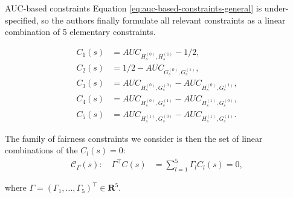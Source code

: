 \begin{frame}{AUC-based constraints}
    Equation \ref{eq:auc-based-constraints-general} is under-specified, so the authors finally formulate all relevant constraints as a linear combination of 5 elementary constraints.

    \vspace{-0.85cm} 
    \begin{align*}
        C_1(s) &= AUC_{H^{(0)}_s, H^{(1)}_s} - 1/2,\\
        C_2(s) &=   1/2 - AUC_{G^{(0)}_s, G^{(1)}_s},\\
        C_3(s) &= AUC_{H^{(0)}_s, G^{(0)}_s} - AUC_{H^{(0)}_s, G^{(1)}_s}, \\
        C_4(s) &= AUC_{H^{(0)}_s, G^{(1)}_s} - AUC_{H^{(1)}_s, G^{(0)}_s}, \\
        C_5(s) &= AUC_{H^{(1)}_s, G^{(0)}_s} - AUC_{H^{(1)}_s, G^{(1)}_s}.
    \end{align*}


    The family of fairness constraints we consider is then the set of linear
    combinations of the $C_l(s) = 0$:
    \begin{align}\label{eq:barycenter-constraint-formulation}
        \mathcal{C}_\Gamma(s): \quad \Gamma^\top C(s) &= \textstyle\sum_{l=1}^5
        \Gamma_l C_l (s) = 0,
    \end{align}

    where $\Gamma = (\Gamma_1 , \dots, \Gamma_5)^\top \in \mathbf{R}^5$.


\end{frame}



